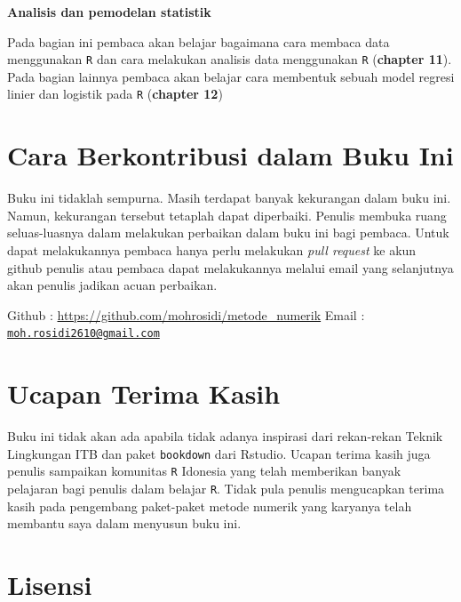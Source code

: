 \documentclass[]{book}
\theoremstyle{definition}
\theoremstyle{definition}
\theoremstyle{definition}
\theoremstyle{remark}
\begin{document}
\textbf{Analisis dan pemodelan statistik}

Pada bagian ini pembaca akan belajar bagaimana cara membaca data menggunakan \texttt{R} dan cara melakukan analisis data menggunakan \texttt{R} (\textbf{chapter 11}). Pada bagian lainnya pembaca akan belajar cara membentuk sebuah model regresi linier dan logistik pada \texttt{R} (\textbf{chapter 12})

\hypertarget{cara-berkontribusi-dalam-buku-ini}{%
\section*{Cara Berkontribusi dalam Buku Ini}\label{cara-berkontribusi-dalam-buku-ini}}

Buku ini tidaklah sempurna. Masih terdapat banyak kekurangan dalam buku ini. Namun, kekurangan tersebut tetaplah dapat diperbaiki. Penulis membuka ruang seluas-luasnya dalam melakukan perbaikan dalam buku ini bagi pembaca. Untuk dapat melakukannya pembaca hanya perlu melakukan \emph{pull request} ke akun github penulis atau pembaca dapat melakukannya melalui email yang selanjutnya akan penulis jadikan acuan perbaikan.

Github : \url{https://github.com/mohrosidi/metode_numerik}
Email : \href{mailto:moh.rosidi2610@gmail.com}{\nolinkurl{moh.rosidi2610@gmail.com}}

\hypertarget{ucapan-terima-kasih}{%
\section*{Ucapan Terima Kasih}\label{ucapan-terima-kasih}}

Buku ini tidak akan ada apabila tidak adanya inspirasi dari rekan-rekan Teknik Lingkungan ITB dan paket \texttt{bookdown} dari Rstudio. Ucapan terima kasih juga penulis sampaikan komunitas \texttt{R} Idonesia yang telah memberikan banyak pelajaran bagi penulis dalam belajar \texttt{R}. Tidak pula penulis mengucapkan terima kasih pada pengembang paket-paket metode numerik yang karyanya telah membantu saya dalam menyusun buku ini.

\hypertarget{lisensi}{%
\section*{Lisensi}\label{lisensi}}
\end{document}
